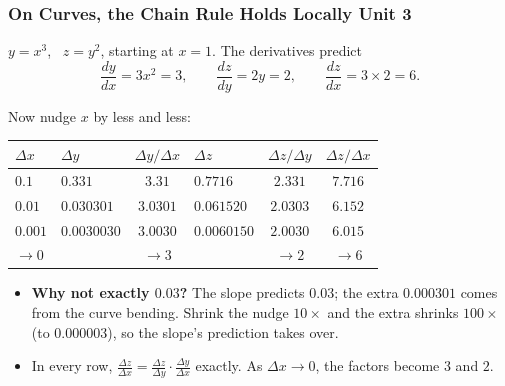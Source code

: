 \documentclass[12pt]{beamer}
\newcommand{\FrameTitle}[2]{\frametitle{#1 \hfill \small\textnormal{\textcolor{midgray}{#2}}}}
\begin{document}
\begin{frame}\FrameTitle{On Curves, the Chain Rule Holds Locally}{Unit 3}
    \vspace{-1em}
    {\small
    $y = x^3$, \ $z = y^2$, starting at $x = 1$. The derivatives predict
    \[
        \frac{dy}{dx} = 3x^2 = 3, \qquad
        \frac{dz}{dy} = 2y = 2, \qquad
        \frac{dz}{dx} = 3 \times 2 = 6.
    \]

    \vspace{-1mm}
    Now nudge $x$ by less and less:
    \begin{center}
    \scriptsize
    \begin{tabular}{l l c l c c}
        \toprule
        $\Delta x$ & $\Delta y$ & $\Delta y / \Delta x$ &
        $\Delta z$ & $\Delta z / \Delta y$ & $\Delta z / \Delta x$ \\
        \midrule
        $0.1$   & $0.331$     & $3.31$   & $0.7716$   & $2.331$  & $7.716$ \\
        $0.01$  & $0.030301$  & $3.0301$ & $0.061520$ & $2.0303$ & $6.152$ \\
        $0.001$ & $0.0030030$ & $3.0030$ & $0.0060150$ & $2.0030$ & $6.015$ \\
        \midrule
        $\to 0$ &             & $\to 3$  &            & $\to 2$  & $\to 6$ \\
        \bottomrule
    \end{tabular}
    \end{center}
    \small
    \begin{itemize}
        \item \textbf{Why not exactly $0.03$?} The slope predicts $0.03$;
              the extra $0.000301$ comes from the curve bending.
              Shrink the nudge $10\times$ and the extra shrinks $100\times$
              (to $0.000003$), so the slope's prediction takes over.
        \item In every row, $\tfrac{\Delta z}{\Delta x}
              = \tfrac{\Delta z}{\Delta y}\cdot\tfrac{\Delta y}{\Delta x}$
              exactly. As $\Delta x \to 0$, the factors become $3$ and $2$.
    \end{itemize}}
\end{frame}
\end{document}
